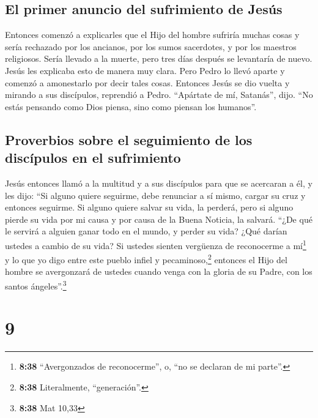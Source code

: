 \hypertarget{el-primer-anuncio-del-sufrimiento-de-jesuxfas}{%
\subsection{El primer anuncio del sufrimiento de
Jesús}\label{el-primer-anuncio-del-sufrimiento-de-jesuxfas}}

 Entonces comenzó a explicarles que el Hijo del hombre
sufriría muchas cosas y sería rechazado por los ancianos, por los sumos
sacerdotes, y por los maestros religiosos. Sería llevado a la muerte,
pero tres días después se levantaría de nuevo.  Jesús les
explicaba esto de manera muy clara. Pero Pedro lo llevó aparte y comenzó
a amonestarlo por decir tales cosas.  Entonces Jesús se
dio vuelta y mirando a sus discípulos, reprendió a Pedro. ``Apártate de
mí, Satanás'', dijo. ``No estás pensando como Dios piensa, sino como
piensan los humanos''.

\hypertarget{proverbios-sobre-el-seguimiento-de-los-discuxedpulos-en-el-sufrimiento}{%
\subsection{Proverbios sobre el seguimiento de los discípulos en el
sufrimiento}\label{proverbios-sobre-el-seguimiento-de-los-discuxedpulos-en-el-sufrimiento}}

 Jesús entonces llamó a la multitud y a sus discípulos
para que se acercaran a él, y les dijo: ``Si alguno quiere seguirme,
debe renunciar a sí mismo, cargar su cruz y entonces seguirme.
 Si alguno quiere salvar su vida, la perderá, pero si
alguno pierde su vida por mi causa y por causa de la Buena Noticia, la
salvará.  ``¿De qué le servirá a alguien ganar todo en el
mundo, y perder su vida?  ¿Qué darían ustedes a cambio de
su vida?  Si ustedes sienten vergüenza de reconocerme a
mí\footnote{\textbf{8:38} ``Avergonzados de reconocerme'', o, ``no se
  declaran de mi parte''.} y lo que yo digo entre este pueblo infiel y
pecaminoso,\footnote{\textbf{8:38} Literalmente, ``generación''.}
entonces el Hijo del hombre se avergonzará de ustedes cuando venga con
la gloria de su Padre, con los santos ángeles''.\footnote{\textbf{8:38}
  Mat 10,33}

\hypertarget{section-8}{%
\section{9}\label{section-8}}


